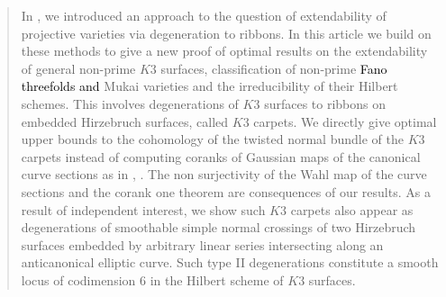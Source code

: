 \documentclass[11pt,twoside]{amsart}
\theoremstyle{plain}
\numberwithin{equation}{section}
\theoremstyle{definition}
\begin{document}
\maketitle
\begin{abstract}

In \cite{BM24}, we introduced an approach to the question of extendability of projective varieties via degeneration to ribbons. In this article we build on these methods to give a new proof of optimal results on the extendability of general non-prime $K3$ surfaces, classification of non-prime \textcolor{black}{Fano threefolds and} Mukai varieties and the irreducibility of their Hilbert schemes. 
This involves degenerations of $K3$ surfaces to ribbons on embedded Hirzebruch surfaces, called $K3$ carpets. We directly give optimal upper bounds to the cohomology of the twisted normal bundle of the $K3$ carpets instead of computing coranks of Gaussian maps of the canonical curve sections as in \cite{CLM94}, \cite{CLM98}. The non surjectivity of the Wahl map of the curve sections and the corank one theorem are consequences of our results. %
As a result of independent interest, we show such $K3$ carpets also appear as degenerations of smoothable simple normal crossings of two Hirzebruch surfaces embedded by arbitrary linear series intersecting along an anticanonical elliptic curve. 
Such type II degenerations constitute a smooth locus of codimension $6$ in the Hilbert scheme of $K3$ surfaces. 

\end{abstract}
\end{document}
